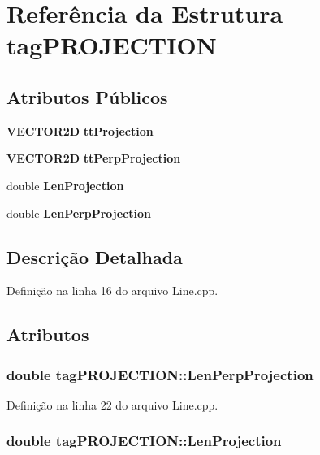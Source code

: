 \section{Referência da Estrutura tag\+P\+R\+O\+J\+E\+C\+T\+I\+ON}
\label{structtag_p_r_o_j_e_c_t_i_o_n}
\subsection*{Atributos Públicos}
\begin{DoxyCompactItemize}
\item 
{\bf V\+E\+C\+T\+O\+R2D} {\bf tt\+Projection}
\item 
{\bf V\+E\+C\+T\+O\+R2D} {\bf tt\+Perp\+Projection}
\item 
double {\bf Len\+Projection}
\item 
double {\bf Len\+Perp\+Projection}
\end{DoxyCompactItemize}


\subsection{Descrição Detalhada}


Definição na linha 16 do arquivo Line.\+cpp.



\subsection{Atributos}
\subsubsection[{Len\+Perp\+Projection}]{\setlength{\rightskip}{0pt plus 5cm}double tag\+P\+R\+O\+J\+E\+C\+T\+I\+O\+N\+::\+Len\+Perp\+Projection}\label{structtag_p_r_o_j_e_c_t_i_o_n_aec48980d39f43f202e213d2c7f80ca95}


Definição na linha 22 do arquivo Line.\+cpp.

\subsubsection[{Len\+Projection}]{\setlength{\rightskip}{0pt plus 5cm}double tag\+P\+R\+O\+J\+E\+C\+T\+I\+O\+N\+::\+Len\+Projection}\label{structtag_p_r_o_j_e_c_t_i_o_n_a9dc0d6a375382496977b35db4440785c}


